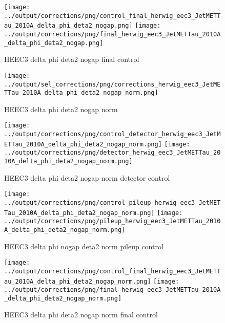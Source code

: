 \documentclass[11pt]{book}
\begin{document}
\begin{figure}[ht]
\centering
\texttt{[image: ../output/corrections/png/control\_final\_herwig\_eec3\_JetMETTau\_2010A\_delta\_phi\_deta2\_nogap.png]}
\texttt{[image: ../output/corrections/png/final\_herwig\_eec3\_JetMETTau\_2010A\_delta\_phi\_deta2\_nogap.png]}
\caption{HEEC3 delta phi deta2 nogap final control}
\label{fig:HEEC3_JetMETTau_2010A_delta_phi_deta2_nogap_final_control}
\end{figure}

\begin{figure}[ht]
\centering
\texttt{[image: ../output/sel\_corrections/png/corrections\_herwig\_eec3\_JetMETTau\_2010A\_delta\_phi\_deta2\_nogap\_norm.png]}
\caption{HEEC3 delta phi deta2 nogap norm}
\label{fig:HEEC3_JetMETTau_2010A_delta_phi_deta2_nogap_norm}
\end{figure}

\begin{figure}[ht]
\centering
\texttt{[image: ../output/corrections/png/control\_detector\_herwig\_eec3\_JetMETTau\_2010A\_delta\_phi\_deta2\_nogap\_norm.png]}
\texttt{[image: ../output/corrections/png/detector\_herwig\_eec3\_JetMETTau\_2010A\_delta\_phi\_deta2\_nogap\_norm.png]}
\caption{HEEC3 delta phi deta2 nogap norm detector control}
\label{fig:HEEC3_JetMETTau_2010A_delta_phi_deta2_nogap_norm_detector_control}
\end{figure}

\begin{figure}[ht]
\centering
\texttt{[image: ../output/corrections/png/control\_pileup\_herwig\_eec3\_JetMETTau\_2010A\_delta\_phi\_deta2\_nogap\_norm.png]}
\texttt{[image: ../output/corrections/png/pileup\_herwig\_eec3\_JetMETTau\_2010A\_delta\_phi\_deta2\_nogap\_norm.png]}
\caption{HEEC3 delta phi nogap deta2 norm pileup control}
\label{fig:HEEC3_JetMETTau_2010A_delta_phi_deta2_nogap_norm_pileup_control}
\end{figure}


\begin{figure}[ht]
\centering
\texttt{[image: ../output/corrections/png/control\_final\_herwig\_eec3\_JetMETTau\_2010A\_delta\_phi\_deta2\_nogap\_norm.png]}
\texttt{[image: ../output/corrections/png/final\_herwig\_eec3\_JetMETTau\_2010A\_delta\_phi\_deta2\_nogap\_norm.png]}
\caption{HEEC3 delta phi deta2 nogap norm final control}
\label{fig:HEEC3_JetMETTau_2010A_delta_phi_deta2_nogap_norm_final_control}
\end{figure}
\end{document}
